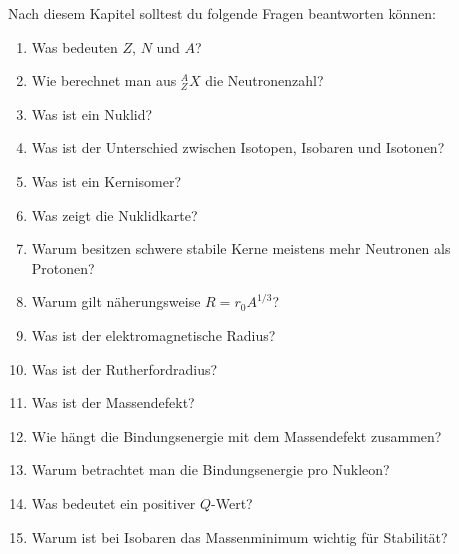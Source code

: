 \begin{examtipbox}
Nach diesem Kapitel solltest du folgende Fragen beantworten können:
\begin{enumerate}
    \item Was bedeuten $Z$, $N$ und $A$?
    \item Wie berechnet man aus ${}^A_ZX$ die Neutronenzahl?
    \item Was ist ein Nuklid?
    \item Was ist der Unterschied zwischen Isotopen, Isobaren und Isotonen?
    \item Was ist ein Kernisomer?
    \item Was zeigt die Nuklidkarte?
    \item Warum besitzen schwere stabile Kerne meistens mehr Neutronen als Protonen?
    \item Warum gilt näherungsweise $R=r_0A^{1/3}$?
    \item Was ist der elektromagnetische Radius?
    \item Was ist der Rutherfordradius?
    \item Was ist der Massendefekt?
    \item Wie hängt die Bindungsenergie mit dem Massendefekt zusammen?
    \item Warum betrachtet man die Bindungsenergie pro Nukleon?
    \item Was bedeutet ein positiver $Q$-Wert?
    \item Warum ist bei Isobaren das Massenminimum wichtig für Stabilität?
\end{enumerate}
\end{examtipbox}